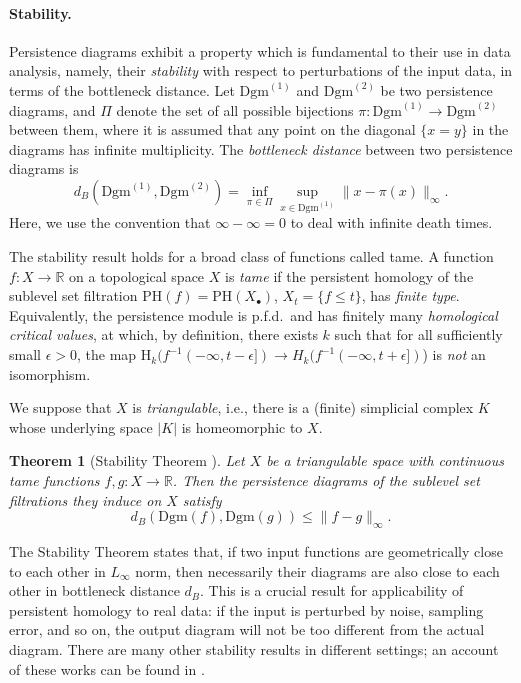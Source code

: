 \documentclass[11pt]{article}
\newcommand{\R}{\mathbb{R}}
\newcommand{\Dgm}{\mathrm{Dgm}}
\newcommand{\PH}{\mathrm{PH}}
\newcommand{\eps}{\epsilon}
\newcommand{\Xb}{X_\bullet}
\renewcommand{\H}{\mathrm{H}}
\theoremstyle{plain}
\newtheorem{thm}{Theorem}
\theoremstyle{definition}
\theoremstyle{remark}
\begin{document}
\paragraph{Stability.}
Persistence diagrams exhibit a property which is fundamental to their use in data analysis, namely, their \textit{stability} with respect to perturbations of the input data, in terms of the bottleneck distance.
Let $\Dgm^{(1)}$ and $\Dgm^{(2)}$ be two persistence diagrams, and $\Pi$ denote the set of all possible bijections $\pi : \Dgm^{(1)} \to \Dgm^{(2)}$ between them, where it is assumed that any point on the diagonal $\{x = y\}$ in the diagrams has infinite multiplicity. 
The \emph{bottleneck distance} between two persistence diagrams is
\[d_B(\Dgm^{(1)}, \Dgm^{(2)}) = \inf \limits_{\pi \in \Pi} \sup \limits_{x \in \Dgm^{(1)}} \|x - \pi(x) \|_\infty.\]
Here, we use the convention that $\infty - \infty = 0$ to deal with infinite death times.

The stability result holds for a broad class of functions called tame.
A function $f : X \to \R$ on a topological space $X$ is \emph{tame} if the persistent homology of the sublevel set filtration $\PH(f) = \PH(\Xb)$, $X_t = \{f \leq t\}$, has \textit{finite type}. 
Equivalently, the persistence module is p.f.d.~and has finitely many \emph{homological critical values}, at which, by definition, there exists $k$ such that for all sufficiently small $\eps > 0$, the map $\H_k(f^{-1}(-\infty,t-\eps]) \to H_k(f^{-1}(-\infty,t+\eps])$) is \textit{not} an isomorphism.

We suppose that $X$ is \emph{triangulable}, i.e., there is a (finite) simplicial complex $K$ whose underlying space $|K|$ is homeomorphic to $X$.
\begin{thm}[Stability Theorem \citep{cohen-steiner_stability_2007}]
	\label{thm:stability_thm}
Let $X$ be a triangulable space with continuous tame functions $f, g : X \to \R$.
Then the persistence diagrams of the sublevel set filtrations they induce on $X$ satisfy
\[d_B(\Dgm(f), \Dgm(g)) \leq \|f - g\|_\infty.\]
\end{thm}
The Stability Theorem states that, if two input functions are geometrically close to each other in $L_\infty$ norm, then necessarily their diagrams are also close to each other in bottleneck distance $d_B$.  
This is a crucial result for applicability of persistent homology to real data: if the input is perturbed by noise, sampling error, and so on, the output diagram will not be too different from the actual diagram.
There are many other stability results in different settings; an account of these works can be found in \cite[Section 2.3]{cao_approximating_2022}.
\end{document}
